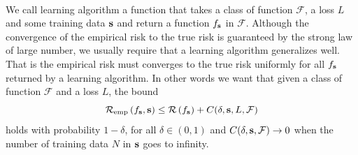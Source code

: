 \paragraph{}
We call learning algorithm a function that takes a class of function
$\mathcal{F}$, a loss $L$ and some training data $\boldsymbol{\mathbf{s}}$ and return a
function $f_{\boldsymbol{\mathbf{s}}}$ in $\mathcal{F}$. Although the convergence of
the empirical risk to the true risk is guaranteed by the strong law of large
number, we usually require that a learning algorithm generalizes well. That is
the empirical risk must converges to the true risk uniformly for all
$f_{\boldsymbol{\mathbf{s}}}$ returned by a learning algorithm. In other words we want 
that given a class of function $\mathcal{F}$ and a loss $L$, the bound
\begin{dmath*}
    \riskemp{f_{\seq{s}}, \seq{s}} \le \risk{f_{\seq{s}}} + C(\delta, \seq{s},
    L, \mathcal{F})
\end{dmath*}
holds with probability $1-\delta$, for all $\delta\in(0, 1)$ and $C(\delta,
\boldsymbol{\mathbf{s}}, \mathcal{F}) \to 0$ when the number of training data $N$ in $\boldsymbol{\mathbf{s}}$
goes to infinity.

